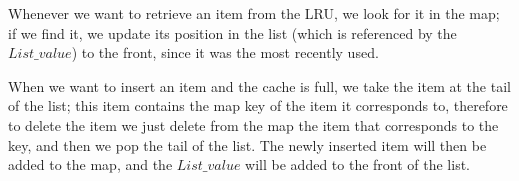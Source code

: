 Whenever we want to retrieve an item from the LRU, we look for it in the map; if we find it, we update its position in the list (which is referenced by the $List\_value$) to the front, since it was the most recently used.

When we want to insert an item and the cache is full, we take the item at the tail of the list; this item contains the map key of the item it corresponds to, therefore to delete the item we just delete from the map the item that corresponds to the key, and then we pop the tail of the list. 
The newly inserted item will then be added to the map, and the $List\_value$ will be added to the front of the list.



